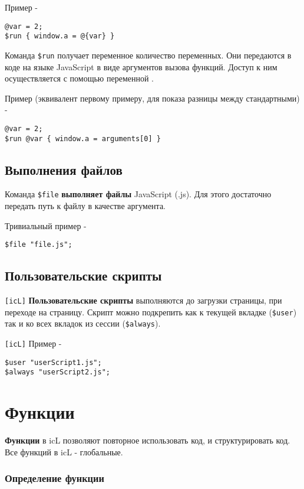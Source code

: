 \documentclass[a4paper, 14pt]{extarticle}
\begin{document}
\noindent \code{[icL]} Пример -
\begin{lstlisting}[numbers=none]
@var = 2;
$run { window.a = @{var} }
\end{lstlisting}

\code{[w3c]} Команда \lstinline|$run| получает переменное количество переменных. Они передаются в коде на языке JavaScript в виде аргументов вызова функций. Доступ к ним осуществляется с помощью переменной .

\noindent \code{[w3c]} Пример (эквивалент первому примеру, для показа разницы между стандартными) -
\begin{lstlisting}[numbers=none]
@var = 2;
$run @var { window.a = arguments[0] }
\end{lstlisting}

\subsection{Выполнения файлов}

Команда \lstinline|$file| {\bf выполняет файлы} JavaScript (.js). Для этого достаточно передать путь к файлу в качестве аргумента.

\noindent Тривиальный пример -
\begin{lstlisting}[numbers=none]
$file "file.js";
\end{lstlisting}

\subsection{Пользовательские скрипты}

\lstinline|[icL]| {\bf Пользовательские скрипты} выполняются до загрузки страницы, при переходе на страницу. Скрипт можно подкрепить как к текущей вкладке (\lstinline|$user|) так и ко всех вкладок из сессии (\lstinline|$always|).

\noindent \lstinline|[icL]| Пример -
\begin{lstlisting}[numbers=none]
$user "userScript1.js";
$always "userScript2.js";
\end{lstlisting}

\newpage
\section{Функции}

{\bf Функции} в icL позволяют повторное использовать код, и структурировать код. Все функций в icL - глобальные.

\subsubsection{Определение функции}
\end{document}
